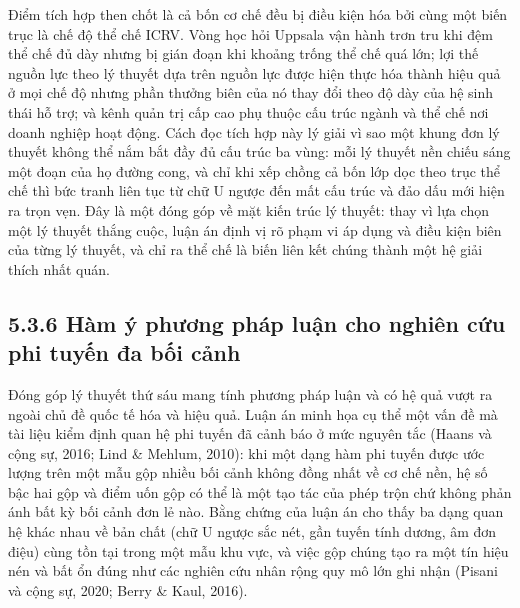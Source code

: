 \documentclass[
  a4paper,
  13pt]{extreport}
\begin{document}
Điểm tích hợp then chốt là cả bốn cơ chế đều bị điều kiện hóa bởi cùng
một biến trục là chế độ thể chế ICRV. Vòng học hỏi Uppsala vận hành trơn
tru khi đệm thể chế đủ dày nhưng bị gián đoạn khi khoảng trống thể chế
quá lớn; lợi thế nguồn lực theo lý thuyết dựa trên nguồn lực được hiện
thực hóa thành hiệu quả ở mọi chế độ nhưng phần thưởng biên của nó thay
đổi theo độ dày của hệ sinh thái hỗ trợ; và kênh quản trị cấp cao phụ
thuộc cấu trúc ngành và thể chế nơi doanh nghiệp hoạt động. Cách đọc
tích hợp này lý giải vì sao một khung đơn lý thuyết không thể nắm bắt
đầy đủ cấu trúc ba vùng: mỗi lý thuyết nền chiếu sáng một đoạn của họ
đường cong, và chỉ khi xếp chồng cả bốn lớp dọc theo trục thể chế thì
bức tranh liên tục từ chữ U ngược đến mất cấu trúc và đảo dấu mới hiện
ra trọn vẹn. Đây là một đóng góp về mặt kiến trúc lý thuyết: thay vì lựa
chọn một lý thuyết thắng cuộc, luận án định vị rõ phạm vi áp dụng và
điều kiện biên của từng lý thuyết, và chỉ ra thể chế là biến liên kết
chúng thành một hệ giải thích nhất quán.

\hypertarget{huxe0m-uxfd-phux1b0ux1a1ng-phuxe1p-luux1eadn-cho-nghiuxean-cux1ee9u-phi-tuyux1ebfn-ux111a-bux1ed1i-cux1ea3nh}{%
\subsection{5.3.6 Hàm ý phương pháp luận cho nghiên cứu phi tuyến đa bối
cảnh}\label{huxe0m-uxfd-phux1b0ux1a1ng-phuxe1p-luux1eadn-cho-nghiuxean-cux1ee9u-phi-tuyux1ebfn-ux111a-bux1ed1i-cux1ea3nh}}

Đóng góp lý thuyết thứ sáu mang tính phương pháp luận và có hệ quả vượt
ra ngoài chủ đề quốc tế hóa và hiệu quả. Luận án minh họa cụ thể một vấn
đề mà tài liệu kiểm định quan hệ phi tuyến đã cảnh báo ở mức nguyên tắc
(Haans và cộng sự, 2016; Lind \& Mehlum, 2010): khi một dạng hàm phi
tuyến được ước lượng trên một mẫu gộp nhiều bối cảnh không đồng nhất về
cơ chế nền, hệ số bậc hai gộp và điểm uốn gộp có thể là một tạo tác của
phép trộn chứ không phản ánh bất kỳ bối cảnh đơn lẻ nào. Bằng chứng của
luận án cho thấy ba dạng quan hệ khác nhau về bản chất (chữ U ngược sắc
nét, gần tuyến tính dương, âm đơn điệu) cùng tồn tại trong một mẫu khu
vực, và việc gộp chúng tạo ra một tín hiệu nén và bất ổn đúng như các
nghiên cứu nhân rộng quy mô lớn ghi nhận (Pisani và cộng sự, 2020; Berry
\& Kaul, 2016).
\end{document}
